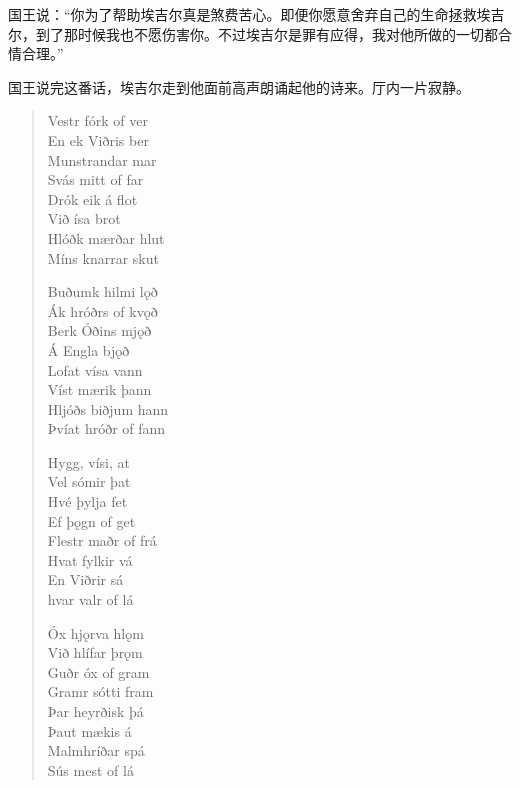 \begin{translation*}{}
  国王说：“你为了帮助埃吉尔真是煞费苦心。即便你愿意舍弃自己的生命拯救埃吉尔，到了那时候我也不愿伤害你。不过埃吉尔是罪有应得，我对他所做的一切都合情合理。”

  国王说完这番话，埃吉尔走到他面前高声朗诵起他的诗来。厅内一片寂静。
\end{translation*}

\begin{paracol}{2}
  \begin{quote}
    Vestr fórk of ver\\
    En ek Viðris ber\\
    Munstrandar mar\\
    Svás mitt of far\\
    Drók eik á flot\\
    Við ísa brot\\
    Hlóðk mærðar hlut\\
    Míns knarrar skut

    Buðumk hilmi lǫð\\
    Ák hróðrs of kvǫð\\
    Berk Óðins mjǫð\\
    Á Engla bjǫð\\
    Lofat vísa vann\\
    Víst mærik þann\\
    Hljóðs biðjum hann\\
    Þvíat hróðr of fann

    Hygg, vísi, at\\
    Vel sómir þat\\
    Hvé þylja fet\\
    Ef þǫgn of get\\
    Flestr maðr of frá \\
    Hvat fylkir vá\\
    En Viðrir sá \\
    hvar valr of lá

    Óx hjǫrva hlǫm\\
    Við hlífar þrǫm\\
    Guðr óx of gram\\
    Gramr sótti fram\\
    Þar heyrðisk þá\\
    Þaut mækis á\\
    Malmhríðar spá\\
    Sús mest of lá


\end{quote}
\end{paracol}
